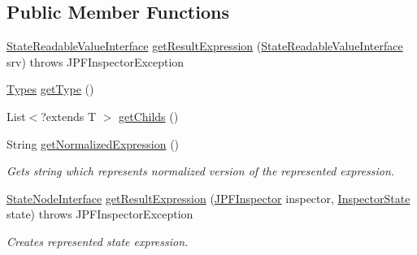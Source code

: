 \subsection*{Public Member Functions}
\begin{DoxyCompactItemize}
\item 
\hyperlink{interfacegov_1_1nasa_1_1jpf_1_1inspector_1_1server_1_1programstate_1_1_state_readable_value_interface}{State\+Readable\+Value\+Interface} \hyperlink{classgov_1_1nasa_1_1jpf_1_1inspector_1_1server_1_1expression_1_1expressions_1_1_expression_state_value_const_a11bde76b1048dc08cc72bb596c357c7c}{get\+Result\+Expression} (\hyperlink{interfacegov_1_1nasa_1_1jpf_1_1inspector_1_1server_1_1programstate_1_1_state_readable_value_interface}{State\+Readable\+Value\+Interface} srv)  throws J\+P\+F\+Inspector\+Exception 
\item 
\hyperlink{enumgov_1_1nasa_1_1jpf_1_1inspector_1_1server_1_1expression_1_1_types}{Types} \hyperlink{classgov_1_1nasa_1_1jpf_1_1inspector_1_1server_1_1expression_1_1expressions_1_1_expression_state_value_a9317f49f60c166a2f46f90702e75f22e}{get\+Type} ()
\item 
List$<$?extends T $>$ \hyperlink{classgov_1_1nasa_1_1jpf_1_1inspector_1_1server_1_1expression_1_1_expression_state_unary_operator_ad010bcb9c4e2eb584321b5ceba8e1682}{get\+Childs} ()
\item 
String \hyperlink{interfacegov_1_1nasa_1_1jpf_1_1inspector_1_1server_1_1expression_1_1_expression_node_interface_ae5387d8da0126c1256a786d54b9bd7ce}{get\+Normalized\+Expression} ()
\begin{DoxyCompactList}\small\item\em Gets string which represents normalized version of the represented expression. \end{DoxyCompactList}\item 
\hyperlink{interfacegov_1_1nasa_1_1jpf_1_1inspector_1_1server_1_1programstate_1_1_state_node_interface}{State\+Node\+Interface} \hyperlink{interfacegov_1_1nasa_1_1jpf_1_1inspector_1_1server_1_1expression_1_1_expression_state_root_node_ab4b2088b28e070af5102f32a85721c6c}{get\+Result\+Expression} (\hyperlink{classgov_1_1nasa_1_1jpf_1_1inspector_1_1server_1_1jpf_1_1_j_p_f_inspector}{J\+P\+F\+Inspector} inspector, \hyperlink{interfacegov_1_1nasa_1_1jpf_1_1inspector_1_1server_1_1expression_1_1_inspector_state}{Inspector\+State} state)  throws J\+P\+F\+Inspector\+Exception
\begin{DoxyCompactList}\small\item\em Creates represented state expression. \end{DoxyCompactList}\end{DoxyCompactItemize}
